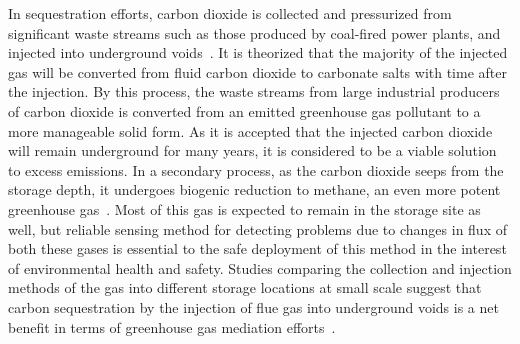 \documentclass[journal]{IEEEtran}
\begin{document}
In sequestration efforts, carbon dioxide is collected and pressurized from significant waste streams such as those produced by coal-fired power plants, and injected into underground voids~\cite{white_separation_2003}.  It is theorized that the majority of the injected gas will be converted from fluid carbon dioxide to carbonate salts with time after the injection.  By this process, the waste streams from large industrial producers of carbon dioxide is converted from an emitted greenhouse gas pollutant to a more manageable solid form.  As it is accepted that the injected carbon dioxide will remain underground for many years, it is considered to be a viable solution to excess emissions.  In a secondary process, as the carbon dioxide seeps from the storage depth, it undergoes biogenic reduction to methane, an even more potent greenhouse gas~\cite{romanak_process-based_2012}. Most of this gas is expected to remain in the storage site as well, but reliable sensing method for detecting problems due to changes in flux of both these gases is essential to the safe deployment of this method in the interest of environmental health and safety.  Studies comparing the collection and injection methods of the gas into different storage locations at small scale suggest that carbon sequestration by the injection of flue gas into underground voids is a net benefit in terms of greenhouse gas mediation efforts~\cite{khoo_life_2006}.  

\end{document}
